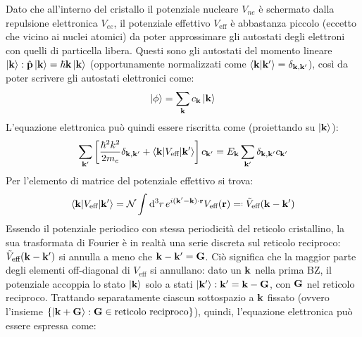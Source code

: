 Dato che all'interno del cristallo il potenziale nucleare $ V_{ne} $ è schermato dalla repulsione elettronica $ V_{ee} $, il potenziale effettivo $ V_\text{eff} $ è abbastanza piccolo (eccetto che vicino ai nuclei atomici) da poter approssimare gli autostati degli elettroni con quelli di particella libera. Questi sono gli autostati del momento lineare $ \ket{\mathbf{k}} : \hat{\mathbf{p}} \ket{\mathbf{k}} = \hbar \mathbf{k} \ket{\mathbf{k}} $ (opportunamente normalizzati come $ \braket{\mathbf{k} | \mathbf{k}'} = \delta_{\mathbf{k}, \mathbf{k}'} $), così da poter scrivere gli autostati elettronici come:
\begin{equation}
	\ket{\phi} = \sum_{\mathbf{k}} c_{\mathbf{k}} \ket{\mathbf{k}}
\end{equation}
L'equazione elettronica può quindi essere riscritta come (proiettando su $ \ket{\mathbf{k}} $):
\begin{equation}
	\sum_{\mathbf{k}'} \left[ \frac{\hbar^2 k^2}{2m_e} \delta_{\mathbf{k},\mathbf{k}'} + \braket{\mathbf{k} | V_\text{eff} | \mathbf{k}'} \right] c_{\mathbf{k}'} = E_{\mathbf{k}} \sum_{\mathbf{k}'} \delta_{\mathbf{k},\mathbf{k}'} c_{\mathbf{k}'}
\end{equation}
Per l'elemento di matrice del potenziale effettivo si trova:
\begin{equation}
	\braket{\ve{k} | V_\text{eff} | \ve{k}'} = \mathcal{N} \int \dd^3r\, e^{i (\ve{k}' - \ve{k}) \cdot \ve{r}} V_\text{eff}(\ve{r}) \eqdef \tilde{V}_\text{eff}(\ve{k} - \ve{k}')
\end{equation}
Essendo il potenziale periodico con stessa periodicità del reticolo cristallino, la sua trasformata di Fourier è in realtà una serie discreta sul reticolo reciproco: $ \tilde{V}_\text{eff}(\mathbf{k} - \mathbf{k}') $ si annulla a meno che $ \mathbf{k} - \mathbf{k}' = \mathbf{G} $. Ciò significa che la maggior parte degli elementi off-diagonal di $ V_\text{eff} $ si annullano: dato un $ \mathbf{k} $ nella prima BZ, il potenziale accoppia lo stato $ \ket{\mathbf{k}} $ solo a stati $ \ket{\mathbf{k}'} : \mathbf{k}' = \mathbf{k} - \mathbf{G} $, con $ \mathbf{G} $ nel reticolo reciproco. Trattando separatamente ciascun sottospazio a $ \mathbf{k} $ fissato (ovvero l'insieme $ \{\ket{\mathbf{k} + \mathbf{G}} : \mathbf{G} \in \text{reticolo reciproco}\} $), quindi, l'equazione elettronica può essere espressa come:
